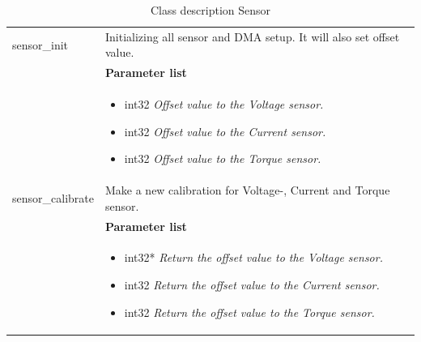 \begin{table}[H]
\begin{tabular}{|p{5 cm}|p{10 cm}|}
			sensor\_init
			& Initializing all sensor and DMA setup. It will also set offset value.   
			\\ & \textbf{Parameter list}
			\\ & \begin{itemize}
				\item {\large int32}
				\subitem \textit{Offset value to the Voltage sensor.}
				\item {\large int32}
				\subitem \textit{Offset value to the Current sensor.}
				\item {\large int32}
				\subitem \textit{Offset value to the Torque sensor.}
			\end{itemize}
			\\ \hline
			
			sensor\_calibrate
			& Make a new calibration for Voltage-, Current and Torque sensor.    
			\\ & \textbf{Parameter list}
			\\ & \begin{itemize}
				\item {\large int32*}
				\subitem \textit{Return the offset value to the Voltage sensor.}
				\item {\large int32}
				\subitem \textit{Return the offset value to the Current sensor.}
				\item {\large int32}
				\subitem \textit{Return the offset value to the Torque sensor.}
			\end{itemize}
			\\ \hline
			
		\end{tabular}
		\caption{Class description Sensor}
		\label{table:Class_description_Sensor_RR_PSoC}
		
\end{table}




